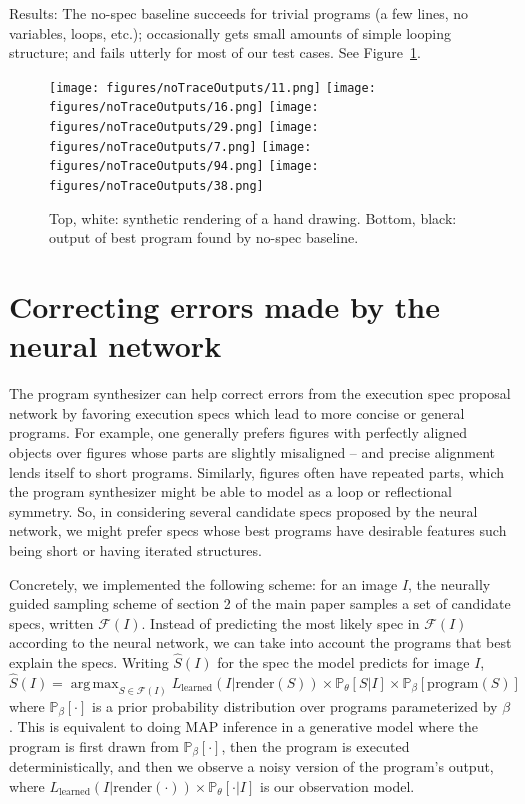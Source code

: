 \documentclass{article}
\DeclareMathOperator*{\argmax}{arg\,max} %
\newcommand{\probability}{\mathds{P}} %
\begin{document}
Results: The no-spec baseline succeeds for trivial programs (a few lines, no variables, loops, etc.); occasionally gets small amounts of simple looping structure; and fails utterly for most of our test cases. See Figure~\ref{noSpec}.

\begin{figure}[h]\centering
      \texttt{[image: figures/noTraceOutputs/11.png]}
  \texttt{[image: figures/noTraceOutputs/16.png]}
    \texttt{[image: figures/noTraceOutputs/29.png]}
    \texttt{[image: figures/noTraceOutputs/7.png]}
        \texttt{[image: figures/noTraceOutputs/94.png]}
      \texttt{[image: figures/noTraceOutputs/38.png]}
  \caption{Top, white: synthetic rendering of a hand drawing. Bottom, black: output of best program found by no-spec baseline.}\label{noSpec}
  \end{figure}
 

\section{Correcting errors made by the neural network}\label{synthesizerHelpsParsing}
The program synthesizer can help correct errors from the execution spec proposal network by favoring execution specs which lead to more concise or general programs.
For example, one generally prefers figures with perfectly aligned objects over figures whose parts are slightly misaligned -- and precise alignment lends itself to short programs.
Similarly, figures often have repeated parts,
which the program synthesizer might be able to model as a loop or reflectional symmetry.
So, in considering several candidate specs proposed by the neural network,
we might prefer specs whose best programs have desirable features such being short or having iterated structures.

Concretely, we implemented the following scheme: for an image $I$, the neurally guided sampling scheme of section 2 of the main paper samples a set of candidate specs, written $\mathcal{F}(I)$.
Instead of predicting the most likely spec in $\mathcal{F}(I)$ according to the neural network,
we can take into account the programs that best explain the specs. 
Writing $\hat{S}(I)$ for the spec the model predicts for image $I$,
\begin{equation}
\hat{S}(I) = \argmax_{S\in \mathcal{F}(I)} L_{\text{learned}}(I | \text{render}(S))\times \probability_\theta[S|I] \times\probability_{\beta} [ \text{program}(S)] 
\end{equation}
where $\probability_{\beta} [\cdot]$ is a prior probability
distribution over programs parameterized by $\beta$.
This is equivalent to doing
MAP inference in a generative model where the program is first drawn
from $\probability_{\beta} [\cdot]$, then the program is executed deterministically,
and then we observe a noisy version of the program's output, where $L_\text{learned}(I|\text{render}(\cdot))\times\probability_\theta[\cdot|I]$
is our observation model.
\end{document}
